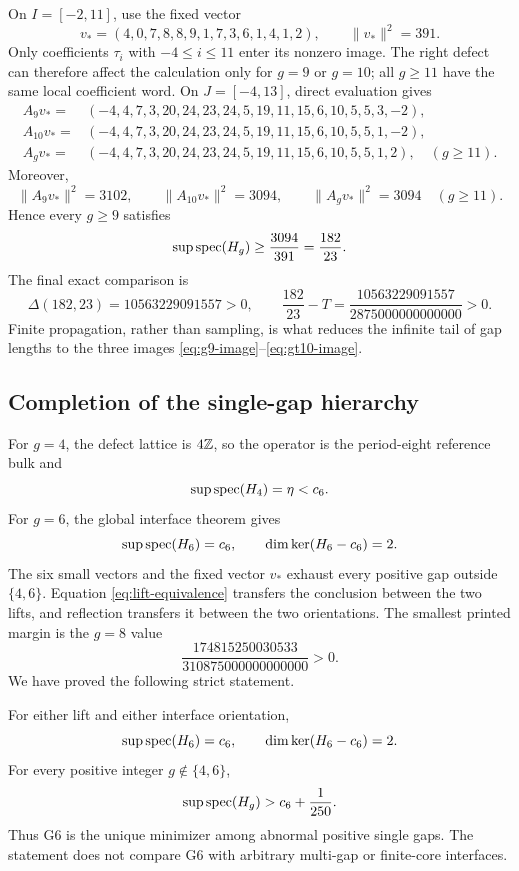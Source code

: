 On \(I=[-2,11]\), use the fixed vector
\begin{equation}
 v_*=(4,0,7,8,8,9,1,7,3,6,1,4,1,2),
 \qquad \|v_*\|^2=391.
 \label{eq:vstar}
\end{equation}
Only coefficients \(\tau_i\) with \(-4\leq i\leq11\) enter its nonzero
image.  The right defect can therefore affect the calculation only for
\(g=9\) or \(g=10\); all \(g\geq11\) have the same local coefficient word.
On \(J=[-4,13]\), direct evaluation gives
\begin{align}
 A_9v_*={}&(-4,4,7,3,20,24,23,24,5,19,11,15,6,10,5,5,3,-2),
 \label{eq:g9-image}\\
 A_{10}v_*={}&(-4,4,7,3,20,24,23,24,5,19,11,15,6,10,5,5,1,-2),
 \label{eq:g10-image}\\
 A_gv_*={}&(-4,4,7,3,20,24,23,24,5,19,11,15,6,10,5,5,1,2),
 \quad(g\geq11). \label{eq:gt10-image}
\end{align}
Moreover,
\[
\|A_9v_*\|^2=3102,\qquad
\|A_{10}v_*\|^2=3094,\qquad
\|A_gv_*\|^2=3094\quad(g\geq11).
\]
Hence every \(g\geq9\) satisfies
\begin{equation}
 \sup\operatorname{spec}(H_g)\geq\frac{3094}{391}=\frac{182}{23}.
\end{equation}
The final exact comparison is
\begin{equation}
 \Delta(182,23)=10563229091557>0,
 \qquad
 \frac{182}{23}-T=
 \frac{10563229091557}{2875000000000000}>0.
 \label{eq:tail-margin}
\end{equation}
Finite propagation, rather than sampling, is what reduces the infinite tail
of gap lengths to the three images \eqref{eq:g9-image}--\eqref{eq:gt10-image}.

\subsection{Completion of the single-gap hierarchy}

For \(g=4\), the defect lattice is \(4\mathbb Z\), so the operator is the
period-eight reference bulk and
\begin{equation}
 \sup\operatorname{spec}(H_4)=\eta<c_6.
\end{equation}
For \(g=6\), the global interface theorem gives
\begin{equation}
 \sup\operatorname{spec}(H_6)=c_6,\qquad
 \dim\ker(H_6-c_6)=2.
\end{equation}
The six small vectors and the fixed vector \(v_*\) exhaust every positive
gap outside \(\{4,6\}\).  Equation \eqref{eq:lift-equivalence} transfers the
conclusion between the two lifts, and reflection transfers it between the
two orientations.  The smallest printed margin is the \(g=8\) value
\[
 \frac{174815250030533}{310875000000000000}>0.
\]
We have proved the following strict statement.

\begin{theorem}
\label{thm:single-gap}
For either lift and either interface orientation,
\[
 \sup\operatorname{spec}(H_6)=c_6,\qquad
 \dim\ker(H_6-c_6)=2.
\]
For every positive integer \(g\notin\{4,6\}\),
\[
 \sup\operatorname{spec}(H_g)>c_6+\frac1{250}.
\]
Thus G6 is the unique minimizer among abnormal positive single gaps.  The
statement does not compare G6 with arbitrary multi-gap or finite-core
interfaces.
\end{theorem}
